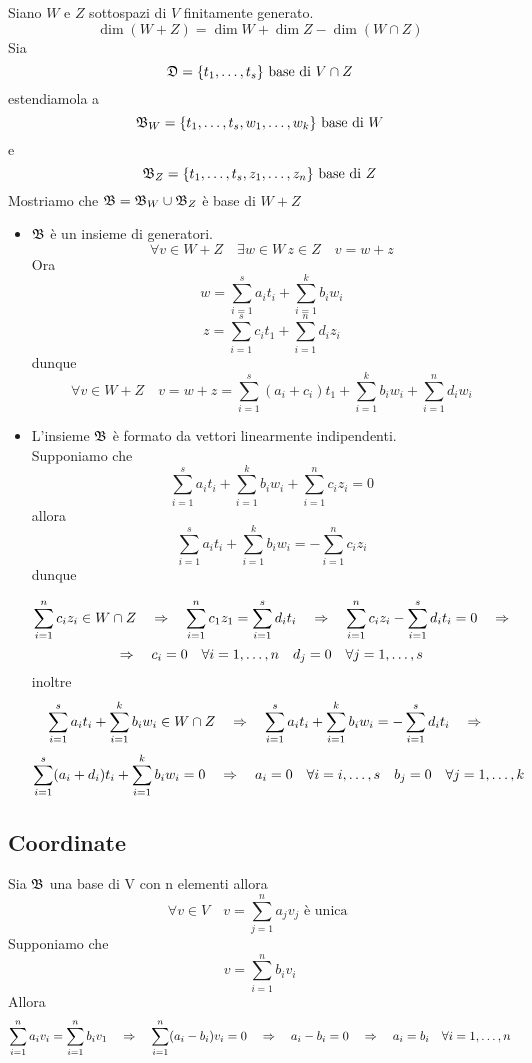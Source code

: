 \begin{prop}\bianco
Siano $W$ e $ Z$ sottospazi di $V$ finitamente generato.
$$ \dim (W+Z) = \dim W + \dim Z - \dim(W\cap Z ) $$
Sia 
$$ \mathfrak{D} = \{ t_1, \dots , t_s \} \text{ base di } V \cap Z $$ 
estendiamola a 
$$ \mathfrak{B}_W =\{ t_1, \dots, t_s, w_1, \dots, w_k \} \text{ base di } W $$
e 
$$ \mathfrak{B}_Z=\{t_1, \dots , t_s, z_1, \dots, z_n \} \text{ base di } Z $$
Mostriamo che $\mathfrak{B}=\mathfrak{B}_W \cup \mathfrak{B}_Z$ \`e base di $W+Z$
\begin{itemize}
\item $\mathfrak{B}$ \`e un insieme di generatori.
$$ \forall v \in W + Z \quad \exists w \in W \, z \in Z \quad v = w+z $$
Ora 
$$ w = \sum_{i=1}^s a_i t_i + \sum_{i=1}^k b_i w_i $$
$$ z = \sum_{i=1}^s c_i t_1+ \sum_{i=1}^n d_i z_i$$
dunque 
$$ \forall v \in W+Z \quad v= w+z =\sum_{i=1}^s (a_i + c_i) t_1 + \sum_{i=1}^k b_i w_i + \sum_{i=1}^n d_i w_i$$
\item L'insieme $\mathfrak{B}$ \`e formato da vettori linearmente indipendenti.\\
Supponiamo che 
$$ \sum_{i=1}^s a_i t_i + \sum_{i=1}^k b_i w_i +\sum_{i=1}^n c_i z_i=0$$
allora
$$ \sum_{i=1}^s a_i t_i + \sum_{i=1}^k b_i w_i =- \sum_{i=1}^n c_i z_i $$
dunque

$$ \sum_{i=1}^n c_i z_i \in W \cap Z \quad \Rightarrow \quad  \sum_{i=1}^n c_1 z_1 = \sum_{i=1}^s d_i t_i \quad \Rightarrow \quad \sum_{i=1}^n c_i z_i - \sum_{i=1}^s d_i t_i =0 \quad \Rightarrow$$
$$ \Rightarrow \quad  c_i = 0 \quad \forall i = 1, \dots, n \quad d_j =0 \quad \forall j=1, \dots,s $$
inoltre 
$$ \sum_{i=1}^s a_i t_i + \sum_{i=1}^k b_i w_i \in W\cap Z  \quad \Rightarrow \quad  \sum_{i=1}^s a_i t_i + \sum_{i=1}^k b_i w_i = -\sum_{i=1}^s d_i t_i  \quad \Rightarrow \quad $$
$$ \sum_{i=1}^s (a_i + d_i)t_i + \sum_{i=1}^k b_i w_i=0 \quad \Rightarrow \quad a_i=0 \quad \forall i=i, \dots, s \quad b_j =0 \quad \forall j=1,\dots, k $$
\end{itemize}
\endproof

\end{prop}
\newpage

\subsection{Coordinate}
\begin{prop}  Sia $\mathfrak{B}$ una base di V con n elementi allora $$ \forall v \in V \quad v = \sum_{j=1}^n a_j v_j \text{ è unica }$$
\proof Supponiamo che 
$$ v= \sum_{i=1}^n b_i v_i $$
Allora 
$$ \sum_{i=1}^n a_i v_i = \sum_{i=1}^n b_i v_1 \quad \Rightarrow\quad \sum _{i=1}^n (a_i - b_i) v_i = 0 \quad \Rightarrow \quad a_i - b_i = 0 \quad \Rightarrow \quad a_i = b_i  \quad \forall i = 1, \dots, n $$
\endproof
\end{prop}

